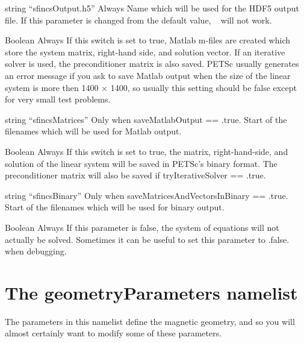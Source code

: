 \myhrule

{string}
{``sfincsOutput.h5''}
{Always}
{Name which will be used for the HDF5 output file.  If this parameter is changed from the default value, \sfincsScan~ will not work.}

\myhrule

{Boolean}
{\false}
{Always}
{If this switch is set to true, Matlab m-files are created which
 store the system matrix, right-hand side, and solution vector.  If an iterative solver is used,
 the preconditioner matrix is also saved.
 PETSc usually generates an error message if you ask to save Matlab output when
the size of the linear system is more then 1400 $\times$ 1400,
 so usually this setting should be false except for very small test problems.
}

\myhrule

{string}
{``sfincsMatrices''}
{Only when {\ttfamily saveMatlabOutput == .true.}}
{Start of the filenames which will be used for Matlab output.}

\myhrule

{Boolean}
{\false}
{Always}
{If this switch is set to true, the matrix, right-hand-side, and solution of the
linear system will be saved in PETSc's binary format.  The preconditioner matrix will also
be saved if {\ttfamily tryIterativeSolver == .true.}
}

\myhrule

{string}
{``sfincsBinary''}
{Only when {\ttfamily saveMatricesAndVectorsInBinary == .true.}}
{Start of the filenames which will be used for binary output.}

\myhrule

{Boolean}
{\true}
{Always}
{If this parameter is false, the system of equations will not actually be solved.
 Sometimes it can be useful to set this parameter to {\ttfamily .false.} when debugging.
}








\section{The {\ttfamily geometryParameters} namelist}
\label{sec:geometryParameters}

The parameters in this namelist define the magnetic geometry, and so you will almost certainly want to modify some of these parameters.


